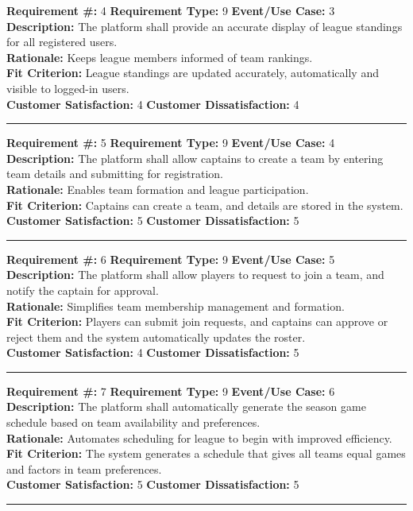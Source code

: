 \documentclass[12pt]{article}
\begin{document}
\textbf{Requirement \#:} 4 \quad \textbf{Requirement Type:} 9 \quad \textbf{Event/Use Case:} 3 \\
\textbf{Description:} The platform shall provide an accurate display of league standings for all registered users.\\
\textbf{Rationale:} Keeps league members informed of team rankings.\\
\textbf{Fit Criterion:} League standings are updated accurately, automatically and visible to logged-in users.\\
\textbf{Customer Satisfaction:} 4 \quad\quad \textbf{Customer Dissatisfaction:} 4\\
\noindent\rule{\textwidth}{1pt}

\textbf{Requirement \#:} 5 \quad \textbf{Requirement Type:} 9 \quad \textbf{Event/Use Case:} 4 \\
\textbf{Description:} The platform shall allow captains to create a team by entering team details and submitting for registration.\\
\textbf{Rationale:} Enables team formation and league participation.\\
\textbf{Fit Criterion:} Captains can create a team, and details are stored in the system.\\
\textbf{Customer Satisfaction:} 5 \quad\quad \textbf{Customer Dissatisfaction:} 5\\
\noindent\rule{\textwidth}{1pt}

\textbf{Requirement \#:} 6 \quad \textbf{Requirement Type:} 9 \quad \textbf{Event/Use Case:} 5 \\
\textbf{Description:} The platform shall allow players to request to join a team, and notify the captain for approval.\\
\textbf{Rationale:} Simplifies team membership management and formation.\\
\textbf{Fit Criterion:} Players can submit join requests, and captains can approve or reject them and the system automatically updates the roster.\\
\textbf{Customer Satisfaction:} 4 \quad\quad \textbf{Customer Dissatisfaction:} 5\\
\noindent\rule{\textwidth}{1pt}

\textbf{Requirement \#:} 7 \quad \textbf{Requirement Type:} 9 \quad \textbf{Event/Use Case:} 6 \\
\textbf{Description:} The platform shall automatically generate the season game schedule based on team availability and preferences.\\
\textbf{Rationale:} Automates scheduling for league to begin with improved efficiency.\\
\textbf{Fit Criterion:} The system generates a schedule that gives all teams equal games and factors in team preferences.\\
\textbf{Customer Satisfaction:} 5 \quad\quad \textbf{Customer Dissatisfaction:} 5\\
\noindent\rule{\textwidth}{1pt}
\end{document}
